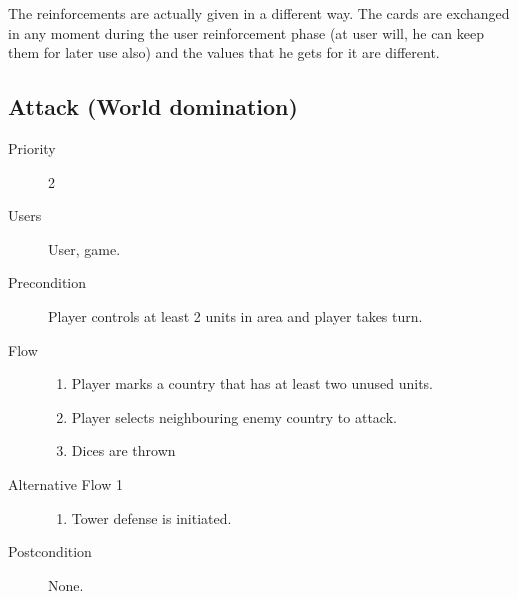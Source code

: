 \documentclass[12pt,a4paper]{article}
\begin{document}
\begin{todo}
  The reinforcements are actually given in a different way. The cards
  are exchanged in any moment during the user reinforcement phase (at
  user will, he can keep them for later use also) and the values that he
  gets for it are different.
\end{todo}

\subsection{Attack (World domination)}
\begin{description}
\item[Priority] 2
\item[Users] User, game.
\item[Precondition] Player controls at least 2 units in area and
  player takes turn.
\item[Flow]\mbox{}
  \begin{enumerate}
  \item Player marks a country that has at least two unused units.
  \item Player selects neighbouring enemy country to attack.
  \item Dices are thrown 
  \end{enumerate}
\item[Alternative Flow 1]\mbox{}
  \begin{enumerate}
  \item Tower defense is initiated.
  \end{enumerate}
\item[Postcondition] None.
\end{description}
\end{document}
